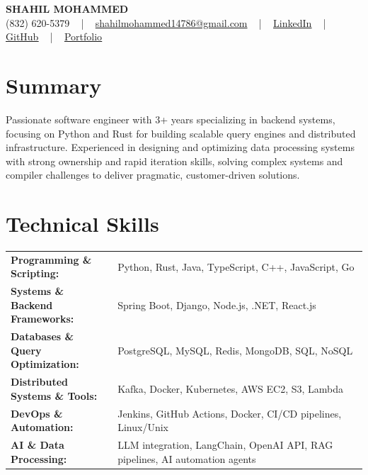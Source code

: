 \documentclass[letterpaper,11pt]{article}
\begin{document}
\begin{center}
    {\fontsize{14pt}{12pt}\selectfont \textbf{\MakeUppercase{Shahil Mohammed}}}\\ \vspace{2pt}
    \fontsize{10pt}{12pt}\selectfont (832) 620-5379 ~ | ~ \href{mailto:shahilmohammed14786@gmail.com}{shahilmohammed14786@gmail.com} ~ | ~  
    \href{https://www.linkedin.com/in/shahil-mohammed-9652931a1/}{\color{blue}\underline{LinkedIn}}  ~ | ~ 
    \href{https://github.com/freakbeast14}{\color{blue}\underline{GitHub}} ~ | ~ 
    \href{https://shahil-mohammed.netlify.app/}{\color{blue}\underline{Portfolio}}
    \vspace{-8pt}
\end{center}

\section{Summary}
\fontsize{9pt}{10pt}\selectfont
Passionate software engineer with 3+ years specializing in backend systems, focusing on Python and Rust for building scalable query engines and distributed infrastructure. Experienced in designing and optimizing data processing systems with strong ownership and rapid iteration skills, solving complex systems and compiler challenges to deliver pragmatic, customer-driven solutions.
 \vspace{-5pt}
 
\section{Technical Skills}
        \vspace{-14pt}
        \begin{table}[h]
            \fontsize{9pt}{10pt}\selectfont
            \begin{tabular}{p{0.3\linewidth} p{0.7\linewidth}}
                \textbf{Programming \& Scripting:} & Python, Rust, Java, TypeScript, C++, JavaScript, Go \\
                \textbf{Systems \& Backend Frameworks:} & Spring Boot, Django, Node.js, .NET, React.js \\
                \textbf{Databases \& Query Optimization:} & PostgreSQL, MySQL, Redis, MongoDB, SQL, NoSQL \\
                \textbf{Distributed Systems \& Tools:} & Kafka, Docker, Kubernetes, AWS EC2, S3, Lambda \\
                \textbf{DevOps \& Automation:} & Jenkins, GitHub Actions, Docker, CI/CD pipelines, Linux/Unix \\
                \textbf{AI \& Data Processing:} & LLM integration, LangChain, OpenAI API, RAG pipelines, AI automation agents \\
            \end{tabular}
        \end{table}
 \vspace{-15pt}
 
\end{document}
